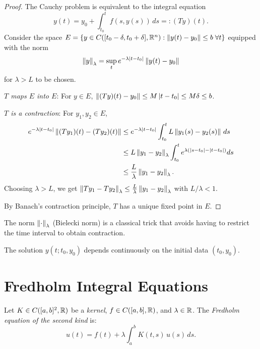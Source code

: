 \begin{proof}
The Cauchy problem is equivalent to the integral equation
\[
  y(t) = y_0 + \int_{t_0}^{t} f(s, y(s)) \, ds =: (Ty)(t).
\]
Consider the space $E = \{y \in C([t_0 - \delta, t_0 + \delta], \mathbb{R}^n) :
\left\| y(t) - y_0 \right\| \leq b \; \forall t\}$ equipped with the norm
\[
  \left\| y \right\|_\lambda = \sup_{t} e^{-\lambda \left| t - t_0 \right|} \left\| y(t) - y_0 \right\|
\]
for $\lambda > L$ to be chosen.

\emph{$T$ maps $E$ into $E$}: For $y \in E$,
$\left\| (Ty)(t) - y_0 \right\| \leq M \left| t - t_0 \right| \leq M\delta \leq b$.

\emph{$T$ is a contraction}: For $y_1, y_2 \in E$,
\begin{align*}
  e^{-\lambda\left| t-t_0 \right|} \left\| (Ty_1)(t) - (Ty_2)(t) \right\|
  &\leq e^{-\lambda\left| t-t_0 \right|} \int_{t_0}^{t} L \left\| y_1(s) - y_2(s) \right\| \, ds \\
  &\leq L \left\| y_1 - y_2 \right\|_\lambda \int_{t_0}^{t} e^{\lambda(\left| s-t_0 \right| - \left| t-t_0 \right|)} ds \\
  &\leq \frac{L}{\lambda} \left\| y_1 - y_2 \right\|_\lambda.
\end{align*}
Choosing $\lambda > L$, we get $\left\| Ty_1 - Ty_2 \right\|_\lambda \leq
\frac{L}{\lambda} \left\| y_1 - y_2 \right\|_\lambda$ with $L/\lambda < 1$.

By Banach's contraction principle, $T$ has a unique fixed point in $E$.
\end{proof}

\begin{remark}
The norm $\left\| \cdot \right\|_\lambda$ (Bielecki norm) is a classical trick that avoids having to
restrict the time interval to obtain contraction.
\end{remark}

\begin{corollary}
The solution $y(t; t_0, y_0)$ depends continuously on the initial data $(t_0, y_0)$.
\end{corollary}

\section{Fredholm Integral Equations}

\begin{definition}
Let $K \in C([a,b]^2, \mathbb{R})$ be a \emph{kernel}, $f \in C([a,b], \mathbb{R})$, and
$\lambda \in \mathbb{R}$. The \emph{Fredholm equation of the second kind} is:
\[
  u(t) = f(t) + \lambda \int_a^b K(t,s) \, u(s) \, ds.
\]
\end{definition}

